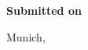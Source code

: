 \vspace*{-1mm}
\textbf{Submitted on}\tab 
\begin{minipage}[t]{\textwidth-\CurrentLineWidth}
	Munich, \Datum\strut
\end{minipage}

\fi




\newpage

%
%
%

%

\renewcommand{\SeitenrandOben}{25.8mm}
\renewcommand{\SeitenrandRechts}{21mm}
\renewcommand{\SeitenrandLinks}{40mm}
\renewcommand{\SeitenrandUnten}{24.8mm}

\restoregeometry
